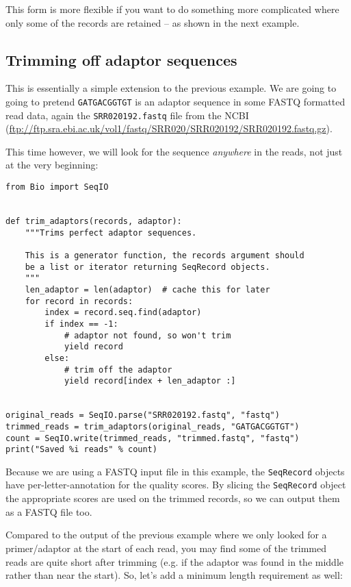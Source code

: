 This form is more flexible if you want to do something more complicated
where only some of the records are retained -- as shown in the next example.

\subsection{Trimming off adaptor sequences}
\label{sec:FASTQ-slicing-off-adaptor}

This is essentially a simple extension to the previous example. We are going
to going to pretend \texttt{GATGACGGTGT} is an adaptor sequence in some FASTQ
formatted read data, again the \texttt{SRR020192.fastq} file from the NCBI
(\url{ftp://ftp.sra.ebi.ac.uk/vol1/fastq/SRR020/SRR020192/SRR020192.fastq.gz}).

This time however, we will look for the sequence \emph{anywhere} in the reads,
not just at the very beginning:

\begin{verbatim}
from Bio import SeqIO


def trim_adaptors(records, adaptor):
    """Trims perfect adaptor sequences.

    This is a generator function, the records argument should
    be a list or iterator returning SeqRecord objects.
    """
    len_adaptor = len(adaptor)  # cache this for later
    for record in records:
        index = record.seq.find(adaptor)
        if index == -1:
            # adaptor not found, so won't trim
            yield record
        else:
            # trim off the adaptor
            yield record[index + len_adaptor :]


original_reads = SeqIO.parse("SRR020192.fastq", "fastq")
trimmed_reads = trim_adaptors(original_reads, "GATGACGGTGT")
count = SeqIO.write(trimmed_reads, "trimmed.fastq", "fastq")
print("Saved %i reads" % count)
\end{verbatim}

Because we are using a FASTQ input file in this example, the \verb|SeqRecord|
objects have per-letter-annotation for the quality scores. By slicing the
\verb|SeqRecord| object the appropriate scores are used on the trimmed
records, so we can output them as a FASTQ file too.

Compared to the output of the previous example where we only looked for
a primer/adaptor at the start of each read, you may find some of the
trimmed reads are quite short after trimming (e.g. if the adaptor was
found in the middle rather than near the start). So, let's add a minimum
length requirement as well:

